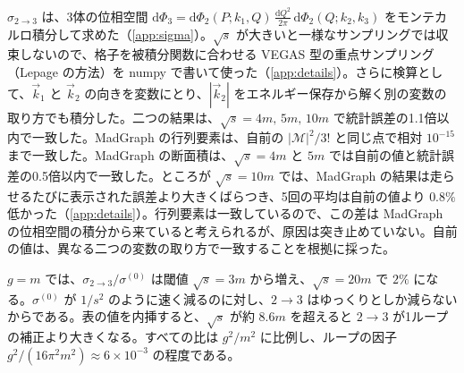 \documentclass[a4paper,10pt]{ltjsarticle}
\newcommand{\dd}{\mathrm{d}}
\begin{document}
$\sigma_{2\to3}$ は、3体の位相空間 $\dd\Phi_3=\dd\Phi_2(P;k_1,Q)\,\frac{\dd Q^2}{2\pi}\,\dd\Phi_2(Q;k_2,k_3)$ をモンテカルロ積分して求めた（\ref{app:sigma}）。$\sqrt s$ が大きいと一様なサンプリングでは収束しないので、格子を被積分関数に合わせる VEGAS 型の重点サンプリング（Lepage の方法）を numpy で書いて使った（\ref{app:details}）。さらに検算として、$\vec k_1$ と $\vec k_2$ の向きを変数にとり、$|\vec k_2|$ をエネルギー保存から解く別の変数の取り方でも積分した。二つの結果は、$\sqrt s=4m,\,5m,\,10m$ で統計誤差の1.1倍以内で一致した。MadGraph の行列要素は、自前の $|\mathcal{M}|^2/3!$ と同じ点で相対 $10^{-15}$ まで一致した。MadGraph の断面積は、$\sqrt s=4m$ と $5m$ では自前の値と統計誤差の0.5倍以内で一致した。ところが $\sqrt s=10m$ では、MadGraph の結果は走らせるたびに表示された誤差より大きくばらつき、5回の平均は自前の値より $0.8\%$ 低かった（\ref{app:details}）。行列要素は一致しているので、この差は MadGraph の位相空間の積分から来ていると考えられるが、原因は突き止めていない。自前の値は、異なる二つの変数の取り方で一致することを根拠に採った。

$g=m$ では、$\sigma_{2\to3}/\sigma^{(0)}$ は閾値 $\sqrt s=3m$ から増え、$\sqrt s=20m$ で $2\%$ になる。$\sigma^{(0)}$ が $1/s^2$ のように速く減るのに対し、$2\to3$ はゆっくりとしか減らないからである。表の値を内挿すると、$\sqrt s$ が約 $8.6m$ を超えると $2\to3$ が1ループの補正より大きくなる。すべての比は $g^2/m^2$ に比例し、ループの因子 $g^2/(16\pi^2m^2)\approx6\times10^{-3}$ の程度である。
\end{document}

